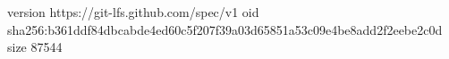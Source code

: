 version https://git-lfs.github.com/spec/v1
oid sha256:b361ddf84dbcabde4ed60c5f207f39a03d65851a53c09e4be8add2f2eebe2c0d
size 87544
